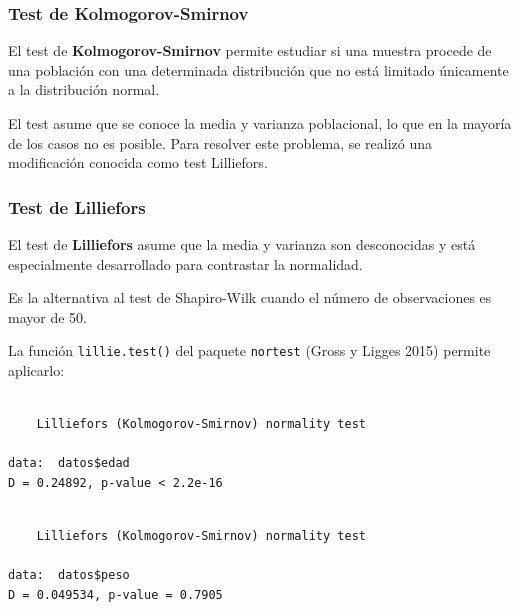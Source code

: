 \documentclass[
  spanish,
  a4paper,
]{scrbook}
\newenvironment{Shaded}{\begin{snugshade}}{\end{snugshade}}
\newcommand{\FunctionTok}[1]{\textcolor[rgb]{0.28,0.35,0.67}{#1}}
\newcommand{\NormalTok}[1]{\textcolor[rgb]{0.00,0.23,0.31}{#1}}
\newcommand{\SpecialCharTok}[1]{\textcolor[rgb]{0.37,0.37,0.37}{#1}}
\begin{document}
\subsubsection{Test de
Kolmogorov-Smirnov}\label{test-de-kolmogorov-smirnov}

El test de \textbf{Kolmogorov-Smirnov} permite estudiar si una muestra
procede de una población con una determinada distribución que no está
limitado únicamente a la distribución normal.

El test asume que se conoce la media y varianza poblacional, lo que en
la mayoría de los casos no es posible. Para resolver este problema, se
realizó una modificación conocida como test Lilliefors.

\subsubsection{Test de Lilliefors}\label{test-de-lilliefors}

El test de \textbf{Lilliefors} asume que la media y varianza son
desconocidas y está especialmente desarrollado para contrastar la
normalidad.

Es la alternativa al test de Shapiro-Wilk cuando el número de
observaciones es mayor de 50.

La función \texttt{lillie.test()} del paquete \texttt{nortest} (Gross y
Ligges 2015) permite aplicarlo:

\begin{Shaded}
\end{Shaded}

\begin{verbatim}

    Lilliefors (Kolmogorov-Smirnov) normality test

data:  datos$edad
D = 0.24892, p-value < 2.2e-16
\end{verbatim}

\begin{Shaded}
\end{Shaded}

\begin{verbatim}

    Lilliefors (Kolmogorov-Smirnov) normality test

data:  datos$peso
D = 0.049534, p-value = 0.7905
\end{verbatim}
\end{document}
